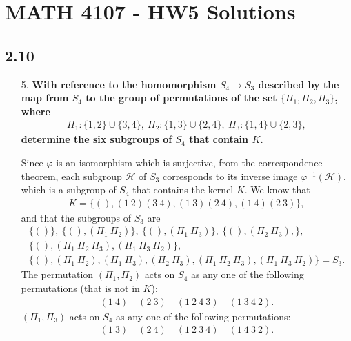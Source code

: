 \documentclass[a4paper,12pt]{article}
\begin{document}
\section*{MATH 4107 - HW5 Solutions}

\subsection*{2.10}
\begin{enumerate}
    \item[5.]
        \boldmath
        \textbf{With reference to the homomorphism $S_4 \to S_3$ described by the map from $S_4$ to the group of permutations of the set $\{ \Pi_1, \Pi_2, \Pi_3 \}$, where
        \begin{align*}
            \Pi_1 : \{ 1, 2 \} \cup \{ 3, 4 \}, \ \Pi_2 : \{ 1, 3 \} \cup \{ 2, 4 \}, \ \Pi_3 : \{ 1, 4 \} \cup \{ 2, 3 \},
        \end{align*}
        determine the six subgroups of $S_4$ that contain $K$.} \par
        \unboldmath
        Since $\varphi$ is an isomorphism which is surjective, from the correspondence theorem, each subgroup $\mathcal{H}$ of $S_3$ corresponds to its inverse image $\varphi^{-1}(\mathcal{H})$, which is a subgroup of $S_4$ that contains the kernel $K$. We know that
        \begin{gather*}
            K = \{ (), (1\ 2)(3\ 4), (1\ 3)(2\ 4), (1\ 4)(2\ 3) \},
        \end{gather*}
        and that the subgroups of $S_3$ are
        \begin{gather*}
            \{ () \}, \ \{ (), (\Pi_1\ \Pi_2) \}, \ \{ (), (\Pi_1\ \Pi_3) \}, \ \{ (), (\Pi_2\ \Pi_3), \}, \\
            \{ (), (\Pi_1\ \Pi_2\ \Pi_3), (\Pi_1\ \Pi_3\ \Pi_2) \}, \\
            \{ (), (\Pi_1\ \Pi_2), (\Pi_1\ \Pi_3), (\Pi_2\ \Pi_3), (\Pi_1\ \Pi_2\ \Pi_3), (\Pi_1\ \Pi_3\ \Pi_2) \} = S_3.
        \end{gather*}
        The permutation $(\Pi_1, \Pi_2)$ acts on $S_4$ as any one of the following permutations (that is not in $K$):
        \begin{gather*}
            (1\ 4) \quad (2\ 3) \quad (1\ 2\ 4\ 3) \quad (1\ 3\ 4\ 2).
        \end{gather*}
        $(\Pi_1, \Pi_3)$ acts on $S_4$ as any one of the following permutations:
        \begin{gather*}
            (1\ 3) \quad (2\ 4) \quad (1\ 2\ 3\ 4) \quad (1\ 4\ 3\ 2).

\end{gather*}
\end{enumerate}
\end{document}
